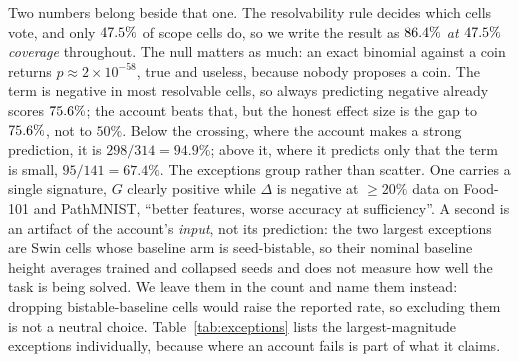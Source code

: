  Two numbers belong beside that one. The resolvability rule decides which
cells vote, and only $47.5\%$ of scope cells do, so we write the
result as $86.4\%$ \emph{at $47.5\%$ coverage} throughout.
The null matters as much: an exact binomial against a coin returns $p \approx
2\times10^{-58}$, true and useless, because nobody proposes a coin. The
\readout{} term is
negative in most resolvable cells, so always predicting negative already
scores $75.6\%$; the account beats that, but the honest effect size
is the gap to $75.6\%$, not to $50\%$. Below the crossing, where
the account makes a strong prediction, it is $298/314 = 94.9\%$; above it,
where it predicts only that the term is small, $95/141 = 67.4\%$. The
\auditWrong{} exceptions group rather than scatter. One carries a single
signature, $G$ clearly positive while $\Delta$ is negative at ${\geq}20\%$ data
on Food-101 and PathMNIST, ``better features, worse accuracy at sufficiency''.
A second is an artifact of the account's \emph{input}, not its prediction: the
two largest exceptions are Swin cells whose baseline arm is seed-bistable, so
their nominal baseline height averages trained and collapsed seeds and does not
measure how well the task is being solved. We leave them in the count and name
them instead: dropping bistable-baseline cells would raise the reported rate,
so excluding them is not a neutral choice. Table~\ref{tab:exceptions} lists the largest-magnitude exceptions
individually, because where an account fails is part of what it claims.

